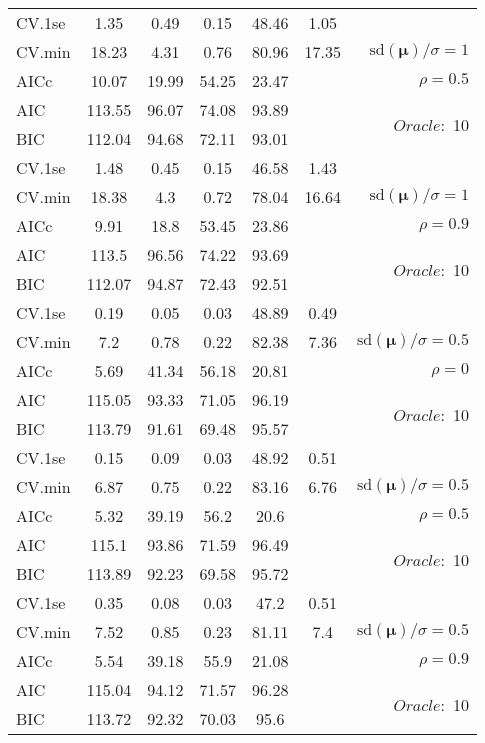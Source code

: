 \begin{table}
\begin{center}
\begin{tabular}{l*{5}{c}|r}
 \hline 
CV.1se & 1.35 & 0.49 & 0.15 & 48.46 & 1.05 & \\
CV.min & 18.23 & 4.31 & 0.76 & 80.96 & 17.35 &  $\mathrm{sd}(\mathbf{\mu})/\sigma=1$ \\
AICc & 10.07 & 19.99 & 54.25 & 23.47 & & $\rho=0.5$ \\
AIC & 113.55 & 96.07 & 74.08 & 93.89 & &  \multirow{2}{*}{$Oracle: $ 10} \\
BIC & 112.04 & 94.68 & 72.11 & 93.01 & &  \\
 \hline 
CV.1se & 1.48 & 0.45 & 0.15 & 46.58 & 1.43 & \\
CV.min & 18.38 & 4.3 & 0.72 & 78.04 & 16.64 &  $\mathrm{sd}(\mathbf{\mu})/\sigma=1$ \\
AICc & 9.91 & 18.8 & 53.45 & 23.86 & & $\rho=0.9$ \\
AIC & 113.5 & 96.56 & 74.22 & 93.69 & &  \multirow{2}{*}{$Oracle: $ 10} \\
BIC & 112.07 & 94.87 & 72.43 & 92.51 & &  \\
 \hline 
CV.1se & 0.19 & 0.05 & 0.03 & 48.89 & 0.49 & \\
CV.min & 7.2 & 0.78 & 0.22 & 82.38 & 7.36 &  $\mathrm{sd}(\mathbf{\mu})/\sigma=0.5$ \\
AICc & 5.69 & 41.34 & 56.18 & 20.81 & & $\rho=0$ \\
AIC & 115.05 & 93.33 & 71.05 & 96.19 & &  \multirow{2}{*}{$Oracle: $ 10} \\
BIC & 113.79 & 91.61 & 69.48 & 95.57 & &  \\
 \hline 
CV.1se & 0.15 & 0.09 & 0.03 & 48.92 & 0.51 & \\
CV.min & 6.87 & 0.75 & 0.22 & 83.16 & 6.76 &  $\mathrm{sd}(\mathbf{\mu})/\sigma=0.5$ \\
AICc & 5.32 & 39.19 & 56.2 & 20.6 & & $\rho=0.5$ \\
AIC & 115.1 & 93.86 & 71.59 & 96.49 & &  \multirow{2}{*}{$Oracle: $ 10} \\
BIC & 113.89 & 92.23 & 69.58 & 95.72 & &  \\
 \hline 
CV.1se & 0.35 & 0.08 & 0.03 & 47.2 & 0.51 & \\
CV.min & 7.52 & 0.85 & 0.23 & 81.11 & 7.4 &  $\mathrm{sd}(\mathbf{\mu})/\sigma=0.5$ \\
AICc & 5.54 & 39.18 & 55.9 & 21.08 & & $\rho=0.9$ \\
AIC & 115.04 & 94.12 & 71.57 & 96.28 & &  \multirow{2}{*}{$Oracle: $ 10} \\
BIC & 113.72 & 92.32 & 70.03 & 95.6 & &  \\
 \hline 
\end{tabular}
\end{center}
\vspace{-1cm}
\end{table}




